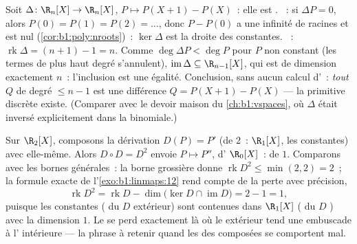 \begin{example}
\label{ex:b1:linmaps:delta}
Soit $\Delta \colon \R_n[X] \to \R_n[X]$, $P \mapsto P(X+1) -
P(X)$~: elle est . ~: si $\Delta P = 0$, alors $P(0) = P(1) =
P(2) = \dots$, donc $P - P(0)$ a une infinité de racines et est
nul (\cref{cor:b1:poly:nroots})~: $\ker\Delta$ est la droite des
constantes. ~: $\operatorname{rk}\Delta = (n + 1) - 1
= n$. Comme $\deg \Delta P < \deg P$ pour $P$ non constant (les termes
de plus haut degré s'annulent), $\operatorname{im}\Delta \subseteq \R_{n-1}[X]$,
qui est de dimension exactement $n$~: l'inclusion est une égalité.
Conclusion, sans aucun calcul d'~: \emph{tout}
 $Q$ de degré $\leq n - 1$ est une différence $Q = P(X+1)
- P(X)$ --- la primitive discrète existe. (Comparer avec le
devoir maison du \cref{ch:b1:vspaces}, où $\Delta$ était
inversé explicitement dans la  binomiale.)
\end{example}

\begin{example}
\label{ex:b1:linmaps:rankbookkeeping}
Sur $\R_2[X]$, composons la dérivation $D(P) = P'$ (de  $2$~:
 $\R_1[X]$,  les constantes) avec elle-même. Alors $D
\circ D = D^2$ envoie $P \mapsto P''$, d' $\R_0[X]$~: de 
$1$. Comparons avec les bornes générales~: la borne grossière donne
$\operatorname{rk} D^2 \leq \min(2, 2) = 2$~; la formule exacte
de l'\cref{exo:b1:linmaps:12} rend compte de la perte avec précision,
\[
\operatorname{rk} D^2 = \operatorname{rk} D -
\dim\bigl(\ker D \cap \operatorname{im} D\bigr) = 2 - 1 = 1 ,
\]
puisque les constantes ( du $D$ extérieur) sont contenues dans
$\R_1[X]$ ( du $D$ ) avec la dimension $1$. Le  se
perd exactement là où le  extérieur tend une embuscade à l'
intérieure --- la phrase à retenir quand les  des composées se
comportent mal.
\end{example}

